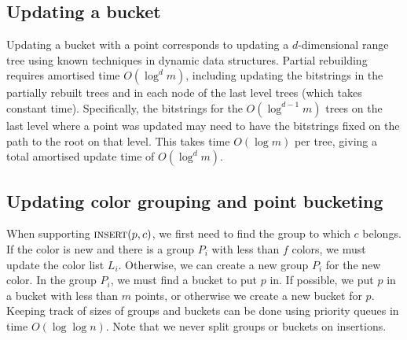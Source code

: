 \subsection{Updating a bucket}
%
Updating a bucket with a point corresponds to updating a $d$-dimensional range tree using known techniques in dynamic data structures. Partial rebuilding \cite{andersson1999general, overmars1983design} requires amortised time $O(\log^d m)$, including updating the bitstrings in the partially rebuilt trees and in each node of the last level trees (which takes constant time). Specifically, the bitstrings for the $O(\log^{d-1} m)$ trees on the last level where a point was updated may need to have the bitstrings fixed on the path to the root on that level. This takes time $O(\log m)$ per tree, giving a total amortised update time of $O(\log^d m)$.

\subsection{Updating color grouping and point bucketing}
\label{sub:update-color-group-bucket}
%
When supporting $\textsc{insert}(p, c)$, we first need to find the group to which $c$ belongs. If the color is new and there is a group $P_i$ with less than $f$ colors, we must update the color list $L_i$. Otherwise, we can create a new group $P_i$ for the new color. In the group $P_i$, we must find a bucket to put $p$ in. If possible, we put $p$ in a bucket with less than $m$ points, or otherwise we create a new bucket for $p$. Keeping track of sizes of groups and buckets can be done using priority queues in time $O(\log \log n)$. Note that we never split groups or buckets on insertions.

